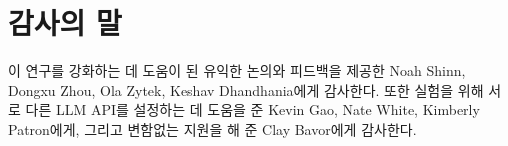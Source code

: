
\section*{감사의 말}
이 연구를 강화하는 데 도움이 된 유익한 논의와 피드백을 제공한 Noah Shinn, Dongxu Zhou, Ola Zytek, Keshav Dhandhania에게 감사한다. 또한 실험을 위해 서로 다른 LLM API를 설정하는 데 도움을 준 Kevin Gao, Nate White, Kimberly Patron에게, 그리고 변함없는 지원을 해 준 Clay Bavor에게 감사한다.
